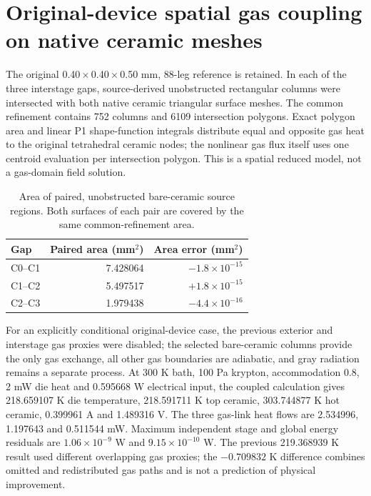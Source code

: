 \clearpage
\section{Original-device spatial gas coupling on native ceramic meshes}
The original 0.40\,$\times$\,0.40\,$\times$\,0.50 mm, 88-leg reference is retained. In each of the three interstage gaps, source-derived unobstructed rectangular columns were intersected with both native ceramic triangular surface meshes. The common refinement contains 752 columns and 6109 intersection polygons. Exact polygon area and linear P1 shape-function integrals distribute equal and opposite gas heat to the original tetrahedral ceramic nodes; the nonlinear gas flux itself uses one centroid evaluation per intersection polygon. This is a spatial reduced model, not a gas-domain field solution.

\begin{table}[htbp]
\centering
\caption{Area of paired, unobstructed bare-ceramic source regions. Both surfaces of each pair are covered by the same common-refinement area.}
\begin{tabular}{lrr}
\toprule
Gap & Paired area (mm$^2$) & Area error (mm$^2$) \\
\midrule
C0--C1 & 7.428064 & $-1.8\times10^{-15}$ \\
C1--C2 & 5.497517 & $+1.8\times10^{-15}$ \\
C2--C3 & 1.979438 & $-4.4\times10^{-16}$ \\
\bottomrule
\end{tabular}
\end{table}

For an explicitly conditional original-device case, the previous exterior and interstage gas proxies were disabled; the selected bare-ceramic columns provide the only gas exchange, all other gas boundaries are adiabatic, and gray radiation remains a separate process. At 300 K bath, 100 Pa krypton, accommodation 0.8, 2 mW die heat and 0.595668 W electrical input, the coupled calculation gives 218.659107 K die temperature, 218.591711 K top ceramic, 303.744877 K hot ceramic, 0.399961 A and 1.489316 V. The three gas-link heat flows are 2.534996, 1.197643 and 0.511544 mW. Maximum independent stage and global energy residuals are $1.06\times10^{-9}$ W and $9.15\times10^{-10}$ W. The previous 219.368939 K result used different overlapping gas proxies; the $-0.709832$ K difference combines omitted and redistributed gas paths and is not a prediction of physical improvement.

